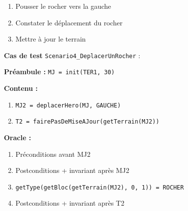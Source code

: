 \documentclass{article}
\newcommand{\cmd}[1]{\texttt{#1}}
\newenvironment{cas}[1]
{
	\hspace{1em}\textbf{Cas de test} \cmd{#1} :
	\begin{list}{}{}
}{
	\end{list}\vspace{1em}
}
\newcommand{\pre}[1]{\item \textbf{Préambule :} \cmd{#1}}
\newcommand{\oram}{\item \textbf{Oracle :}}
\newcommand{\opem}{\item \textbf{Contenu :}}
\begin{document}
	\begin{enumerate}
		\item Pousser le rocher vers la gauche
		\item Constater le déplacement du rocher
		\item Mettre à jour le terrain
	\end{enumerate}

	\begin{cas} {Scenario4\_DeplacerUnRocher}
		\pre{MJ = init(TER1, 30)}
		\opem{}
		\begin{enumerate}
			\item \cmd{MJ2 = deplacerHero(MJ, GAUCHE)}
			\item \cmd{T2 = fairePasDeMiseAJour(getTerrain(MJ2))}
		\end{enumerate}
		\oram{}
		\begin{enumerate}
			\item Préconditions avant MJ2
			\item Postconditions + invariant après MJ2
			\item \cmd{getType(getBloc(getTerrain(MJ2), 0, 1)) = ROCHER}
			\item Postconditions + invariant après T2
		\end{enumerate}
	\end{cas}
\end{document}
